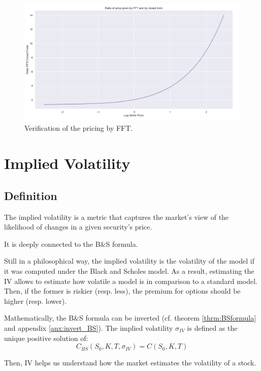 \begin{figure}
\centering
\includegraphics[width = 0.7 \textwidth]{../addition_part/images/integration_fft/fft_ratio.png}
\caption{Verification of the pricing by FFT.}
\label{fig:fft_ratio}
\end{figure}





















\section{Implied Volatility}
\subsection{Definition}

\begin{definition}

The implied volatility is a metric that captures the market's view of the likelihood of changes in a given security's price. 

It is deeply connected to the B$\&$S formula. 

Still in a philosophical way, the implied volatility is the volatility of the model if it was computed under the Black and Scholes model. As a result, estimating the IV allows to estimate how volatile a model is in comparison to a standard model. Then, if the former is riskier (resp. less), the premium for options should be higher (resp. lower). 

Mathematically, the B$\&$S formula can be inverted (cf. theorem \ref{thrm:BSformula} and appendix \ref{anx:invert_BS}). The implied volatility $ \sigma_{IV} $ is defined as the unique positive solution of:
\begin{equation}
\label{eq:IVunique}
C_{BS} ( S_0, K, T, \sigma_{IV} ) = C ( S_0, K, T )
\end{equation}

Then, IV helps us understand how the market estimates the volatility of a stock.

\end{definition}


